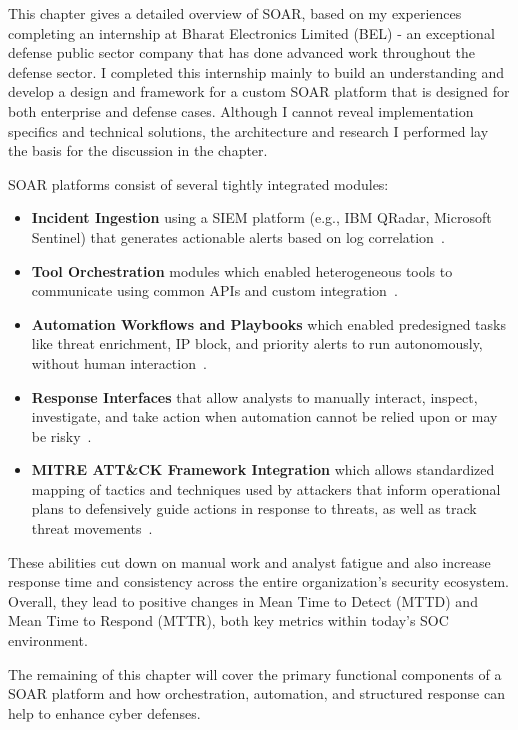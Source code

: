 This chapter gives a detailed overview of SOAR, based on my experiences completing an internship at Bharat Electronics Limited (BEL) - an exceptional defense public sector company that has done advanced work throughout the defense sector. I completed this internship mainly to build an understanding and develop a design and framework for a custom SOAR platform that is designed for both enterprise and defense cases. Although I cannot reveal implementation specifics and technical solutions, the architecture and research I performed lay the basis for the discussion in the chapter. 

SOAR platforms consist of several tightly integrated modules: 
\begin{itemize}[noitemsep,topsep=0pt]
    \item \textbf{Incident Ingestion} using a SIEM platform (e.g., IBM QRadar, Microsoft Sentinel) that generates actionable alerts based on log correlation~\cite{microsoftsiem}.
    \item \textbf{Tool Orchestration} modules which enabled heterogeneous tools to communicate using common APIs and custom integration~\cite{techtarget}.
    \item \textbf{Automation Workflows and Playbooks} which enabled predesigned tasks like threat enrichment, IP block, and priority alerts to run autonomously, without human interaction~\cite{paloalto}.
    \item \textbf{Response Interfaces} that allow analysts to manually interact, inspect, investigate, and take action when automation cannot be relied upon or may be risky~\cite{techtarget}.
    \item \textbf{MITRE ATT\&CK Framework Integration} which allows standardized mapping of tactics and techniques used by attackers that inform operational plans to defensively guide actions in response to threats, as well as track threat movements~\cite{mitre}.
\end{itemize}

These abilities cut down on manual work and analyst fatigue and also increase response time and consistency across the entire organization’s security ecosystem. Overall, they lead to positive changes in Mean Time to Detect (MTTD) and Mean Time to Respond (MTTR), both key metrics within today’s SOC environment.

The remaining of this chapter will cover the primary functional components of a SOAR platform and how orchestration, automation, and structured response can help to enhance cyber defenses.
